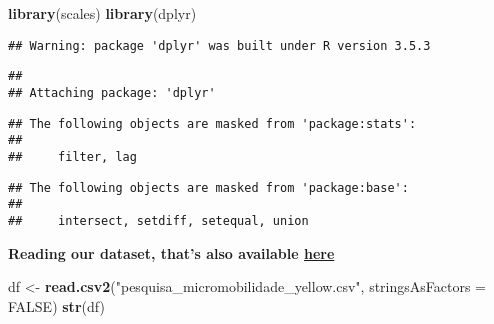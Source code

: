 \documentclass[]{article}
\newenvironment{Shaded}{\begin{snugshade}}{\end{snugshade}}
\newcommand{\KeywordTok}[1]{\textcolor[rgb]{0.13,0.29,0.53}{\textbf{#1}}}
\newcommand{\DataTypeTok}[1]{\textcolor[rgb]{0.13,0.29,0.53}{#1}}
\newcommand{\StringTok}[1]{\textcolor[rgb]{0.31,0.60,0.02}{#1}}
\newcommand{\OtherTok}[1]{\textcolor[rgb]{0.56,0.35,0.01}{#1}}
\newcommand{\NormalTok}[1]{#1}
\begin{document}
\begin{Shaded}
\begin{Highlighting}[]
\KeywordTok{library}\NormalTok{(scales)}
\KeywordTok{library}\NormalTok{(dplyr)}
\end{Highlighting}
\end{Shaded}

\begin{verbatim}
## Warning: package 'dplyr' was built under R version 3.5.3
\end{verbatim}

\begin{verbatim}
## 
## Attaching package: 'dplyr'
\end{verbatim}

\begin{verbatim}
## The following objects are masked from 'package:stats':
## 
##     filter, lag
\end{verbatim}

\begin{verbatim}
## The following objects are masked from 'package:base':
## 
##     intersect, setdiff, setequal, union
\end{verbatim}

\textbf{Reading our dataset, that's also available
\href{https://archive.org/download/pesquisa_micromobilidade_yellow/pesquisa_micromobilidade_yellow.rar}{here}
}

\begin{Shaded}
\begin{Highlighting}[]
\NormalTok{df <-}\StringTok{ }\KeywordTok{read.csv2}\NormalTok{(}\StringTok{"pesquisa_micromobilidade_yellow.csv"}\NormalTok{, }\DataTypeTok{stringsAsFactors =} \OtherTok{FALSE}\NormalTok{)}
\KeywordTok{str}\NormalTok{(df)}
\end{Highlighting}
\end{Shaded}
\end{document}
